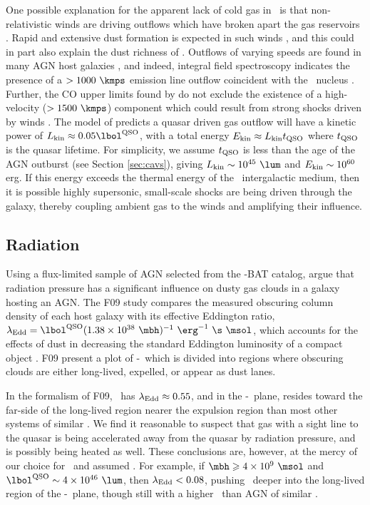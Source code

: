 \documentclass[useAMS,usenatbib]{mn2e}
\begin{document}
One possible explanation for the apparent lack of cold gas in \irs\ is
that non-relativistic winds are driving outflows which have broken
apart the gas reservoirs \citep[\eg][]{2010MNRAS.401....7H}. Rapid and
extensive dust formation is expected in such winds
\citep{2002ApJ...567L.107E}, and this could in part also explain the
dust richness of \irs. Outflows of varying speeds are found in many
AGN host galaxies \citep[see][for a review]{2003ARA&A..41..117C}, and
indeed, integral field spectroscopy indicates the presence of a $>
1000 ~\kmps$ emission line outflow coincident with the \irs\ nucleus
\citep{1996MNRAS.283.1003C}. Further, the CO upper limits found by
\citet{1998ApJ...506..205E} do not exclude the existence of a
high-velocity ($> 1500 ~\kmps$) component which could result from
strong shocks driven by winds \citep[\eg][]{2010arXiv1006.1655F}. The
model of \citet{2005ApJ...619...60L} predicts a quasar driven gas
outflow will have a kinetic power of $L_{\rm{kin}} \approx 0.05
\lqso$, with a total energy $E_{\rm{kin}} \approx L_{\rm{kin}}
t_{\rm{QSO}}$ where $t_{\rm{QSO}}$ is the quasar lifetime. For
simplicity, we assume $t_{\rm{QSO}}$ is less than the age of the AGN
outburst (see Section \ref{sec:cavs}), giving $L_{\rm{kin}} \sim
10^{45} ~\lum$ and $E_{\rm{kin}} \sim 10^{60}$ erg. If this energy
exceeds the thermal energy of the \irs\ intergalactic medium, then it
is possible highly supersonic, small-scale shocks are being driven
through the galaxy, thereby coupling ambient gas to the winds
and amplifying their influence.

\subsection{Radiation}

Using a flux-limited sample of AGN selected from the \swift-BAT
catalog, \citet[][hereafter F09]{2009MNRAS.394L..89F} argue that
radiation pressure has a significant influence on dusty gas clouds in
a galaxy hosting an AGN. The F09 study compares the measured obscuring
column density of each host galaxy with its effective Eddington ratio,
$\leff = \lqso (1.38 \times 10^{38} ~\mbh)^{-1} ~\erg^{-1} ~\s
~\msol$, which accounts for the effects of dust in decreasing the
standard Eddington luminosity of a compact object
\citep[\eg][]{1993ApJ...402..441L}. F09 present a plot of
\nhobs-\leff\ which is divided into regions where obscuring clouds are
either long-lived, expelled, or appear as dust lanes. 

In the formalism of F09, \irs\ has $\lambda_{\mathrm{Edd}} \approx 0.55$, and in the
\nhobs-\leff\ plane, resides toward the far-side of the long-lived
region nearer the expulsion region than most other systems of similar
\nhobs. We find it reasonable to suspect that gas with a sight line to
the quasar is being accelerated away from the quasar by radiation
pressure, and is possibly being heated as well. These conclusions are,
however, at the mercy of our choice for \mbh\ and assumed \lqso. For
example, if $\mbh \ge 4 \times 10^9 ~\msol$ and $\lqso \sim 4 \times
10^{46} ~\lum$, then $\lambda_{\mathrm{Edd}} < 0.08$, pushing \irs\ deeper into the
long-lived region of the \nhobs-\leff\ plane, though still with a
higher \leff\ than AGN of similar \nhobs.
\end{document}
